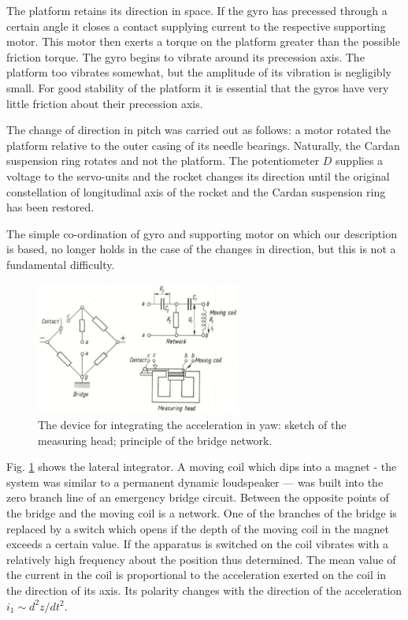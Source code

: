 \documentclass[12pt, a4paper]{article}
\begin{document}
The platform retains its direction in space. If the gyro has precessed through a certain angle it closes a contact supplying current to the respective supporting motor. This motor then exerts a torque on the platform greater than the possible friction torque. The gyro begins to vibrate around its precession axis. The platform too vibrates somewhat, but the amplitude of its vibration is negligibly small. For good stability of the platform it is essential that the gyros have very little friction about their precession axis.

The change of direction in pitch was carried out as follows: a motor rotated the platform relative to the outer casing of its needle bearings. Naturally, the Cardan suspension ring rotates and not the platform. The potentiometer $D$ supplies a voltage to the servo-units and the rocket changes its direction until the original constellation of longitudinal axis of the rocket and the Cardan suspension ring has been restored.

The simple co-ordination of gyro and supporting motor on which our description is based, no longer holds in the case of the changes in direction, but this is not a fundamental difficulty.

\begin{figure}[ht]
  \centering
  \includegraphics[width=0.6\textwidth]{figs/ctrl-17.png}
  \caption{The device for integrating the acceleration in yaw: sketch of the measuring head; principle of the bridge network.}
  \label{fig:17}
\end{figure}

Fig. \ref{fig:17} shows the lateral integrator. A moving coil which dips into a magnet - the system was similar to a permanent dynamic loudspeaker — was built into the zero branch line of an emergency bridge circuit. Between the opposite points of the bridge and the moving coil is a network. One of the branches of the bridge is replaced by a switch which opens if the depth of the moving coil in the magnet exceeds a certain value. If the apparatus is switched on the coil vibrates with a relatively high frequency about the position thus determined. The mean value of the current in the coil is proportional to the acceleration exerted on the coil in the direction of its axis. Its polarity changes with the direction of the acceleration $i_{1}\sim d^{2}z/dt^{2}$.
\end{document}
